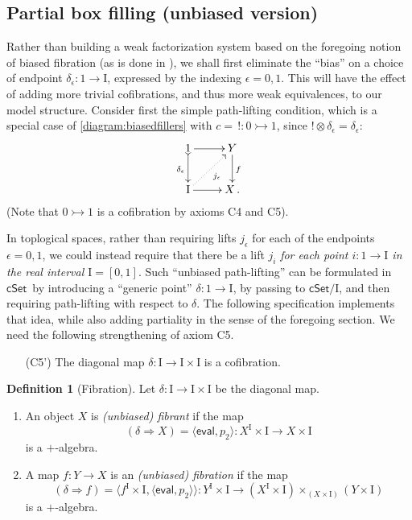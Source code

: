 \documentclass[12pt]{article}
\newcommand{\cSet}{\ensuremath{\mathsf{cSet}}}
\newcommand{\mono}{\ensuremath{\rightarrowtail}}
\newcommand{\ra}{\ensuremath{\rightarrow}}
\newcommand{\I}{\ensuremath{\mathrm{I}}}
\theoremstyle{remark}
\theoremstyle{definition}
\newtheorem{definition}[theorem]{Definition}
\begin{document}
\subsection{Partial box filling (unbiased version)}\label{subsec:unbiasedfibration}


Rather than building a weak factorization system based on the foregoing notion of biased fibration (as is done in \cite{GS}), we shall first eliminate the ``bias'' on a choice of endpoint $\delta_\epsilon : 1 \ra \I$, expressed by the indexing $\epsilon = 0,1$.  This will have the effect of adding more trivial cofibrations, and thus more weak equivalences, to our model structure. Consider first the simple path-lifting condition, which is a special case of \eqref{diagram:biasedfillers} with $c =\, ! : 0\mono 1$, since $!\otimes\delta_\epsilon = \delta_\epsilon$:
\begin{equation*}
\xymatrix{
1 \ar@{>->}[d]_{\delta_\epsilon} \ar[r] & Y \ar[d]^f \\
\I \ar@{.>}[ru]_{j_\epsilon} \ar[r] & X\,.
}
\end{equation*}
(Note that $0\mono 1$ is a cofibration by axioms C4 and C5).

In toplogical spaces, rather than requiring lifts $j_\epsilon$ for each of the endpoints $\epsilon = 0,1$, we could instead require that there be a lift $j_i$ \emph{for each point $i: 1\ra\I$ in the real interval $\I = [0,1]$}. Such ``unbiased path-lifting'' can be formulated in \cSet\ by introducing a ``generic point'' $\delta : 1\ra \I$, by passing to $\cSet/\I$, and then requiring path-lifting with respect to $\delta$.  The following specification implements that  idea, while also adding partiality in the sense of the foregoing section.  We need the following strengthening of axiom C5.

\begin{enumerate}
\item[(C5')] The diagonal map $\delta : \I\ra\I\times\I$ is a cofibration.  
\end{enumerate}

\begin{definition}[Fibration]\label{def:unbiasedfibration}
Let $\delta : \I\ra\I\times\I$ be the diagonal map.
\begin{enumerate}
\item\label{item:fibrant} An object $X$ is \emph{(unbiased) fibrant} if the map 
\[
(\delta\Rightarrow\! X) = \langle\mathsf{eval}, p_2\rangle : X^\I \times \I \ra X\times \I
\]
is a $+$-algebra. 
\item\label{item:fibration} A map $f : Y\ra X$ is an \emph{(unbiased) fibration} if the map 
\[
(\delta\Rightarrow\! f) = \langle f^\I\times \I, \langle \mathsf{eval},p_2 \rangle\rangle: Y^\I\times \I \ra (X^\I \times \I)\times_{(X\times \I)} (Y\times\I)
\]
is a $+$-algebra.
\end{enumerate}
\end{definition}
\end{document}
